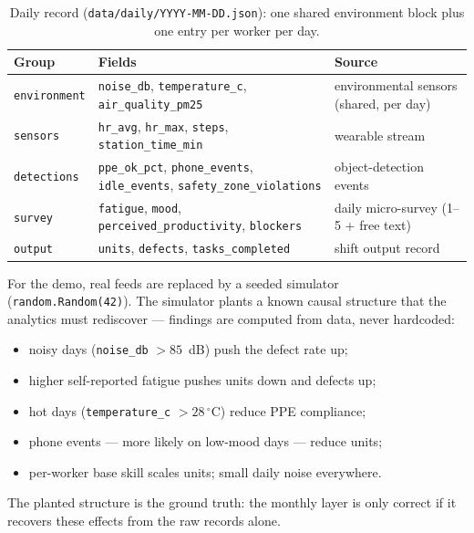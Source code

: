 \documentclass[11pt,a4paper]{article}
\begin{document}
\begin{table}[htbp]
\centering\small
\caption{Daily record (\texttt{data/daily/YYYY-MM-DD.json}): one shared
environment block plus one entry per worker per day.}
\label{tab:schema}
\begin{tabular}{@{}p{2.1cm}p{8.8cm}p{4.7cm}@{}}
\toprule
Group & Fields & Source \\
\midrule
\texttt{environment} & \texttt{noise\_db}, \texttt{temperature\_c},
  \texttt{air\_quality\_pm25} & environmental sensors (shared, per day)\\
\texttt{sensors} & \texttt{hr\_avg}, \texttt{hr\_max}, \texttt{steps},
  \texttt{station\_time\_min} & wearable stream\\
\texttt{detections} & \texttt{ppe\_ok\_pct}, \texttt{phone\_events},
  \texttt{idle\_events}, \texttt{safety\_zone\_violations} &
  object-detection events\\
\texttt{survey} & \texttt{fatigue}, \texttt{mood},
  \texttt{perceived\_productivity}, \texttt{blockers} &
  daily micro-survey (1--5 + free text)\\
\texttt{output} & \texttt{units}, \texttt{defects},
  \texttt{tasks\_completed} & shift output record\\
\bottomrule
\end{tabular}
\end{table}

For the demo, real feeds are replaced by a seeded simulator
(\texttt{random.Random(42)}). The simulator plants a known causal
structure that the analytics must rediscover --- findings are computed
from data, never hardcoded:

\begin{itemize}
\item noisy days (\texttt{noise\_db} $> 85$~dB) push the defect rate up;
\item higher self-reported fatigue pushes units down and defects up;
\item hot days (\texttt{temperature\_c} $> 28\,^\circ$C) reduce PPE
compliance;
\item phone events --- more likely on low-mood days --- reduce units;
\item per-worker base skill scales units; small daily noise everywhere.
\end{itemize}

The planted structure is the ground truth: the monthly layer is only
correct if it recovers these effects from the raw records alone.
\end{document}
